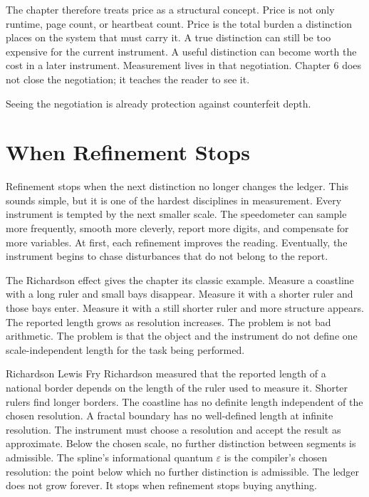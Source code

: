 The chapter therefore treats price as a structural concept. Price is not only
runtime, page count, or heartbeat count. Price is the total burden a distinction
places on the system that must carry it. A true distinction can still be too
expensive for the current instrument. A useful distinction can become worth the
cost in a later instrument. Measurement lives in that negotiation. Chapter 6
does not close the negotiation; it teaches the reader to see it.

Seeing the negotiation is already protection against counterfeit depth.

\section{When Refinement Stops}
\label{se:when-refinement-stops}

Refinement stops when the next distinction no longer changes the ledger. This
sounds simple, but it is one of the hardest disciplines in measurement. Every
instrument is tempted by the next smaller scale. The speedometer can sample
more frequently, smooth more cleverly, report more digits, and compensate for
more variables. At first, each refinement improves the reading. Eventually,
the instrument begins to chase disturbances that do not belong to the report.

The Richardson effect gives the chapter its classic example. Measure a
coastline with a long ruler and small bays disappear. Measure it with a
shorter ruler and those bays enter. Measure it with a still shorter ruler and
more structure appears. The reported length grows as resolution increases. The
problem is not bad arithmetic. The problem is that the object and the
instrument do not define one scale-independent length for the task being
performed.

\begin{gphenom}{Richardson}
\label{ph:richardson}
\GPhObs Lewis Fry Richardson measured that the reported length of a national
border depends on the length of the ruler used to measure it. Shorter rulers
find longer borders. The coastline has no definite length independent of the
chosen resolution.
\GPhCon A fractal boundary has no well-defined length at infinite resolution.
The instrument must choose a resolution and accept the result as approximate.
Below the chosen scale, no further distinction between segments is admissible.
\GPhSeq The spline's informational quantum $\varepsilon$ is the compiler's
chosen resolution: the point below which no further distinction is admissible.
The ledger does not grow forever. It stops when refinement stops buying
anything.
\end{gphenom}

